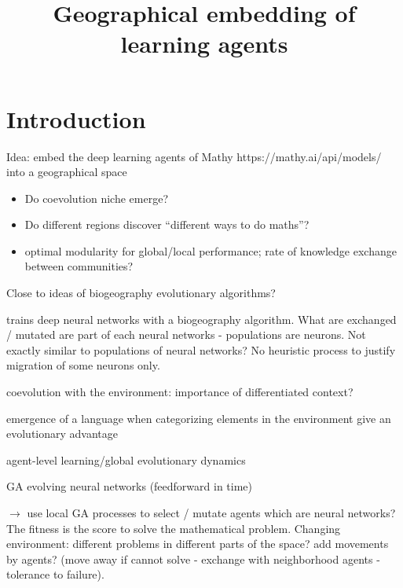 \documentclass{article}
\title{Geographical embedding of learning agents}
\author{}
\date{}
\begin{document}
\maketitle

\section{Introduction}

Idea: embed the deep learning agents of Mathy https://mathy.ai/api/models/ into a geographical space 

\begin{itemize}
    \item Do coevolution niche emerge?
    \item Do different regions discover ``different ways to do maths''?
    \item optimal modularity for global/local performance; rate of knowledge exchange between communities?
\end{itemize}

Close to ideas of biogeography evolutionary algorithms?

\cite{mirjalili2014let} trains deep neural networks with a biogeography algorithm. What are exchanged / mutated are part of each neural networks - populations are neurons. Not exactly similar to populations of neural networks? No heuristic process to justify migration of some neurons only.


\cite{bruce2001evolving}

\cite{lund1995preadaptation} coevolution with the environment: importance of differentiated context?

\cite{cangelosi1998emergence} emergence of a language when categorizing elements in the environment give an evolutionary advantage

\cite{nolfi1994learning} agent-level learning/global evolutionary dynamics

\cite{beer1992evolving} GA evolving neural networks (feedforward in time)

\cite{stanley2002evolving}

$\rightarrow$ use local GA processes to select / mutate agents which are neural networks? The fitness is the score to solve the mathematical problem. Changing environment: different problems in different parts of the space? add movements by agents? (move away if cannot solve - exchange with neighborhood agents - tolerance to failure).

\cite{denaro1997cultural}
\end{document}
